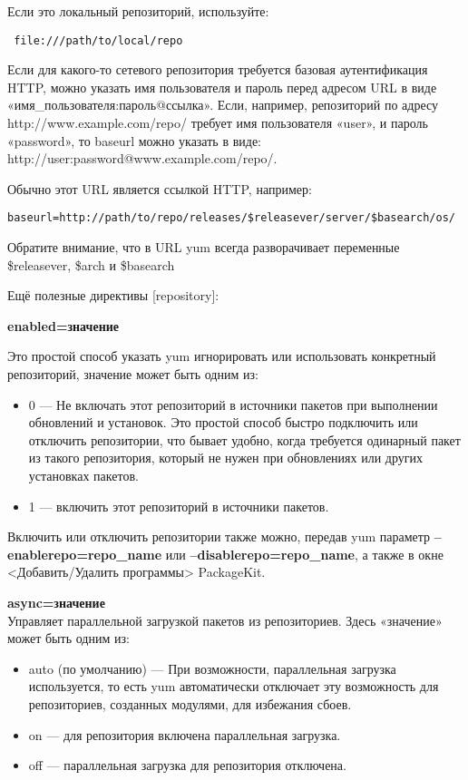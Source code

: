 \documentclass[a4paper,10pt,twoside]{article}
\begin{document}
Если это локальный репозиторий, используйте:
\begin{verbatim}
 file:///path/to/local/repo
\end{verbatim} 

Если для какого-то сетевого репозитория требуется базовая аутентификация HTTP, можно указать имя пользователя и пароль перед адресом URL в виде «имя\_пользователя:пароль@ссылка». Если, например, репозиторий по адресу http://www.example.com/repo/ требует имя пользователя «user», и пароль «password», то baseurl можно указать в виде:  http://user:password@www.example.com/repo/.

Обычно этот URL является ссылкой HTTP, например:
\begin{verbatim}
baseurl=http://path/to/repo/releases/$releasever/server/$basearch/os/
\end{verbatim} 
Обратите внимание, что в URL yum всегда разворачивает переменные \$releasever, \$arch и \$basearch 

Ещё полезные директивы [repository]:

\textbf{enabled=значение}

Это простой способ указать yum игнорировать или использовать конкретный репозиторий, значение может быть одним из:

\begin{itemize}
 \item 0 — Не включать этот репозиторий в источники пакетов при выполнении обновлений и установок. Это простой способ быстро подключить или отключить репозитории, что бывает удобно, когда требуется одинарный пакет из такого репозитория, который не нужен при обновлениях или других установках пакетов.
\item 1 — включить этот репозиторий в источники пакетов.
\end{itemize}

Включить или отключить репозитории также можно, передав yum параметр \textbf{--enablerepo=repo\_name} или \textbf{--disablerepo=repo\_name}, а также в окне <Добавить/Удалить программы> PackageKit.

\textbf{async=значение}\\
Управляет параллельной загрузкой пакетов из репозиториев. Здесь «значение» может быть одним из:

\begin{itemize}
 \item auto (по умолчанию) — При возможности, параллельная загрузка используется, то есть yum автоматически отключает эту возможность для репозиториев, созданных модулями, для избежания сбоев.
\item on — для репозитория включена параллельная загрузка.
\item off — параллельная загрузка для репозитория отключена.
\end{itemize}
\end{document}

